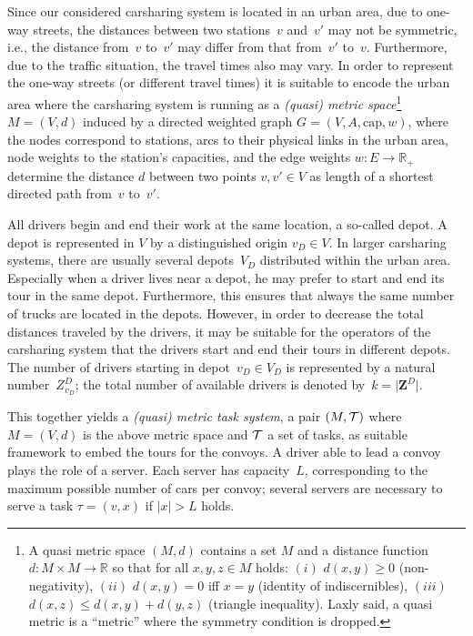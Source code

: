 \documentclass[english]{llncs}
\numberwithin{sublemma}{lemma}
\newcommand{\abs}[1]{\ensuremath{\lvert #1 \rvert}}
\newcommand{\RR}{\ensuremath{\mathbb{R}}}
\newcommand{\capacity}{\ensuremath{\text{cap}}}
\newcommand{\zd}{\boldsymbol{Z}^D} \newcommand{\zzd}{Z^D}
\newcommand{\VD}{V_D}
\begin{document}
Since our considered carsharing system is located in an urban area, due to one-way streets, the distances between two stations~$v$ and~$v'$ may not be symmetric, i.e.,
the distance from~$v$ to~$v'$ 
may differ from that from~$v'$ to~$v$.
Furthermore, due to the traffic situation, the travel times also may vary.
In order to represent the one-way streets (or different travel times) it is suitable to encode the urban area where the carsharing system is running as a
\emph{(quasi) metric space}\footnote{A quasi metric space $(M,d)$ contains a set $M$ and a distance function $d: M \times M \to \RR$ so that for all $x,y,z \in M$ holds:
$(i)$ $d(x,y) \geq 0$ (non-negativity), $(ii)$ $d(x, y) = 0$ iff $x = y$ (identity of indiscernibles), $(iii)$ $d(x,z) \leq d(x,y) + d(y,z)$ (triangle inequality).
Laxly said, a quasi metric is a ``metric'' where the symmetry condition is dropped.}
$M=(V,d)$ induced by a directed weighted graph $G = (V,A,\capacity,w)$, where the nodes correspond to stations, arcs to their physical links in the urban area, node weights to the station's capacities,
and the edge weights $w : E \rightarrow \RR_+$ determine the distance $d$ between two points $v,v' \in V$ as length of a shortest directed path from~$v$ to~$v'$.


All drivers begin and end their work at the same location, a so-called depot.
A depot is represented in $V$ by a distinguished origin $v_D \in V$.
In larger carsharing systems, there are usually several depots~$V_D$ distributed within the urban area.
Especially when a driver lives near a depot, he may prefer to start and end its tour in the same depot.
Furthermore, this ensures that always the same number of trucks are located in the depots.
However, in order to decrease the total distances traveled by the drivers, it may be suitable for the operators of the carsharing system that the drivers start and end their tours in different depots.
The number of drivers starting in depot~$v_D \in \VD$ is represented by a natural number~$\zzd_{v_D}$; the total number of available drivers is denoted by~$k = \abs{\zd}$.


This together yields a \emph{(quasi) metric task system}, a pair $(M, {\cal T})$ where $M = (V, d)$ is the above metric space and ${\cal T}$ a set of tasks, as suitable framework to embed the tours for the convoys. 
A driver able to lead a convoy plays the role of a server.
Each server has capacity~$L$, corresponding to the maximum possible number of cars per convoy; several servers are necessary to serve a task $\tau = (v, x)$ if $\abs{x} > L$ holds.
\end{document}
